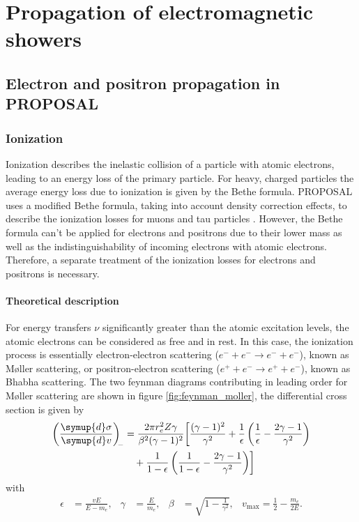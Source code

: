 \chapter{Propagation of electromagnetic showers}

\section{Electron and positron propagation in PROPOSAL}

\subsection{Ionization}

Ionization describes the inelastic collision of a particle with atomic electrons, leading to an energy loss of the primary particle.
For heavy, charged particles the average energy loss due to ionization is given by the Bethe formula.
PROPOSAL uses a modified Bethe formula, taking into account density correction effects, to describe the ionization losses for muons and tau particles \cite{Kohne:2013zbq}.
However, the Bethe formula can't be applied for electrons and positrons due to their lower mass as well as the indistinguishability of incoming electrons with atomic electrons.
Therefore, a separate treatment of the ionization losses for electrons and positrons is necessary.

\subsubsection{Theoretical description}

For energy transfers $\nu$ significantly greater than the atomic excitation levels, the atomic electrons can be considered as free and in rest.
In this case, the ionization process is essentially electron-electron scattering ($e^- + e^- \rightarrow e^- + e^-$), known as M{\o}ller scattering, or positron-electron scattering ($e^+ + e^- \rightarrow e^+ + e^-$), known as Bhabha scattering.
The two feynman diagrams contributing in leading order for M{\o}ller scattering are shown in figure \ref{fig:feynman_moller}, the differential cross section \cite{PhysRev.93.38} is given by
%
\begin{equation}
	\begin{split}
	\label{eqn:moller}
	\left(\frac{\symup{d}\sigma}{\symup{d}v}\right)_{\!\!-} &= \frac{2 \pi r_e^2 Z \gamma}{\beta^2(\gamma - 1)^2} \biggl[ \frac{(\gamma - 1)^2}{\gamma^2} + \frac{1}{\epsilon} \left( \frac{1}{\epsilon} - \frac{2\gamma - 1}{\gamma^2} \right) \\ &\quad+ \frac{1}{1 - \epsilon} \left( \frac{1}{1 - \epsilon} - \frac{2 \gamma - 1}{\gamma^2} \right) \biggr]
	\end{split}
\end{equation}
%
with
%
\begin{align}
	\epsilon &= \frac{v E}{E - m_e},& \gamma &= \frac{E}{m_e}, & \beta &= \sqrt{1 - \frac{1}{\gamma^2}}, & v_{\text{max}} = \frac{1}{2} - \frac{m_e}{2 E}.
\end{align}

